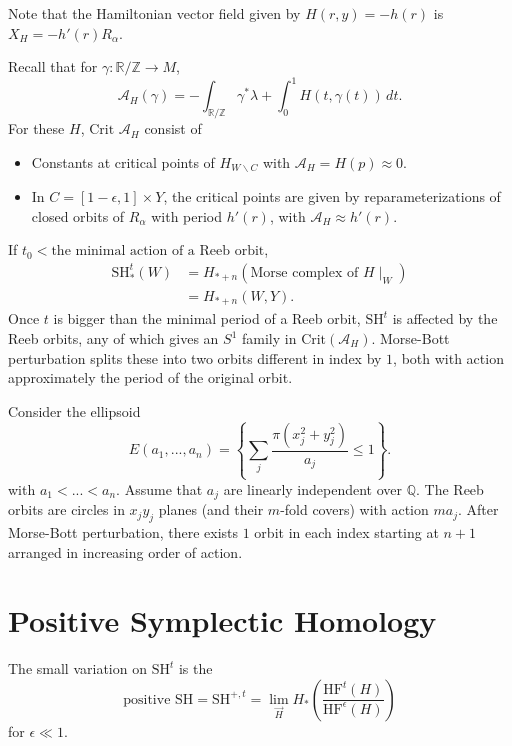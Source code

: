 Note that the Hamiltonian vector field given by $H(r,y)=-h(r)$ is $X_H=-h'(r)R_\alpha$.

Recall that for $\gamma: \mathbb{R}/\mathbb{Z}\to M$,
\[
\mathcal{A}_H(\gamma)=-\int_{\mathbb{R}/\mathbb{Z}} \gamma^* \lambda + \int_0^1 H(t, \gamma(t))\,dt.
\]
For these $H$, $\text{Crit } \mathcal{A}_H$ consist of
\begin{itemize}
\item Constants at critical points of $H_{W\backslash C}$ with $\mathcal{A}_H = H(p) \approx 0$.
\item In $C=[1-\epsilon, 1]\times Y$, the critical points are given by reparameterizations of closed orbits of $R_\alpha$ with period $h'(r)$, with $\mathcal{A}_H \approx h'(r)$.
\end{itemize}

If $t_0< \text{the minimal action of a Reeb orbit}$,
\begin{align*}
\text{SH}_*^t(W) &= H_{*+n}(\text{Morse complex of }H \mid_{W}) \\
&= H_{*+n}(W, Y).
\end{align*}
Once $t$ is bigger than the minimal period of a Reeb orbit, $\text{SH}^t$ is affected by the Reeb orbits, any of which gives an $S^1$ family in $\text{Crit}(\mathcal{A}_H)$. Morse-Bott perturbation splits these into two orbits different in index by $1$, both with action approximately the period of the original orbit.

\begin{example}
[Ellipsoid]

Consider the ellipsoid
\[
E(a_1,...,a_n) = \left\{ \sum_j \dfrac{\pi(x_j^2+y_j^2)}{a_j} \le 1 \right\}.
\]
with $a_1<...<a_n$. Assume that $a_j$ are linearly independent over $\mathbb{Q}$. The Reeb orbits are circles in $x_jy_j$ planes (and their $m$-fold covers) with action $ma_j$.  After Morse-Bott perturbation, there exists $1$ orbit in each index starting at $n+1$ arranged in increasing order of action.

\end{example}

\section{Positive Symplectic Homology}

The small variation on $\text{SH}^t$ is the
\[
\text{positive SH} = \text{SH}^{+,t}=\lim_{\stackrel{\longrightarrow}{H}} H_* \left( \dfrac{\text{HF}^t(H)}{\text{HF}^\epsilon (H)}\right)
\]
for $\epsilon\ll 1$.

